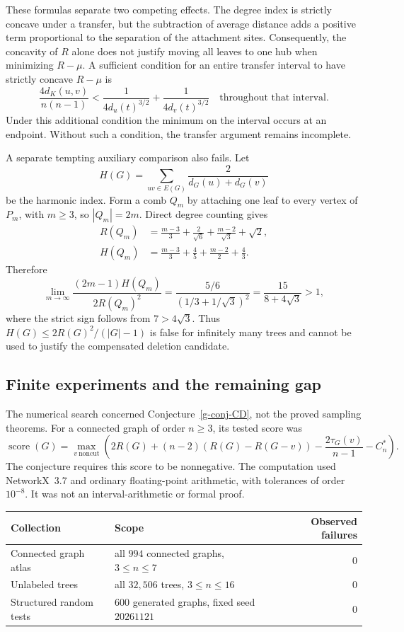 \documentclass[11pt,a4paper]{article}
\theoremstyle{definition}
\theoremstyle{remark}
\begin{document}
These formulas separate two competing effects.  The degree index is
strictly concave under a transfer, but the subtraction of average distance
adds a positive term proportional to the separation of the attachment
sites.  Consequently, the concavity of $R$ alone does not justify moving
all leaves to one hub when minimizing $R-\mu$.  A sufficient condition
for an entire transfer interval to have strictly concave $R-\mu$ is
\[
 \frac{4d_K(u,v)}{n(n-1)}
 <\frac1{4d_u(t)^{3/2}}+\frac1{4d_v(t)^{3/2}}
 \quad\text{throughout that interval}.
\]
Under this additional condition the minimum on the interval occurs at an
endpoint.  Without such a condition, the transfer argument remains
incomplete.

A separate tempting auxiliary comparison also fails.  Let
\[
 H(G)=\sum_{uv\in E(G)}\frac2{d_G(u)+d_G(v)}
\]
be the harmonic index.  Form a comb $Q_m$ by attaching one leaf to every
vertex of $P_m$, with $m\ge3$, so $|Q_m|=2m$.  Direct degree counting gives
\begin{align*}
 R(Q_m)&=\frac{m-3}{3}+\frac2{\sqrt6}
              +\frac{m-2}{\sqrt3}+\sqrt2,\\
 H(Q_m)&=\frac{m-3}{3}+\frac45+\frac{m-2}{2}+\frac43.
\end{align*}
Therefore
\[
 \lim_{m\to\infty}
 \frac{(2m-1)H(Q_m)}{2R(Q_m)^2}
 =\frac{5/6}{(1/3+1/\sqrt3)^2}
 =\frac{15}{8+4\sqrt3}>1,
\]
where the strict sign follows from $7>4\sqrt3$.  Thus
$H(G)\le2R(G)^2/(|G|-1)$ is false for infinitely many trees and cannot
be used to justify the compensated deletion candidate.

\subsection{Finite experiments and the remaining gap}
\label{g-sub-computation}

The numerical search concerned Conjecture~\ref{g-conj-CD}, not the
proved sampling theorems.  For a connected graph of order $n\ge3$, its
tested score was
\[
 \operatorname{score}(G)=
 \max_{v\ \mathrm{noncut}}
 \left(2R(G)+(n-2)(R(G)-R(G-v))
             -\frac{2\tau_G(v)}{n-1}-C_n^*\right).
\]
The conjecture requires this score to be nonnegative.  The computation
used NetworkX~3.7 and ordinary floating-point arithmetic, with tolerances
of order $10^{-8}$.  It was not an interval-arithmetic or formal proof.

\begin{center}
\begin{tabularx}{\linewidth}{@{}lXr@{}}
\toprule
Collection & Scope & Observed failures\\
\midrule
Connected graph atlas & all $994$ connected graphs, $3\le n\le7$ & $0$\\
Unlabeled trees & all $32{,}506$ trees, $3\le n\le16$ & $0$\\
Structured random tests & $600$ generated graphs, fixed seed $20261121$ & $0$\\
\bottomrule
\end{tabularx}
\end{center}
\end{document}
